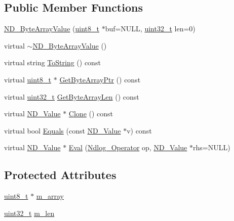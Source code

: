 \subsection*{Public Member Functions}
\begin{DoxyCompactItemize}
\item 
\hyperlink{class_n_d___byte_array_value_abc4b53c37069d57d57e9d2a9323612a3}{N\-D\-\_\-\-Byte\-Array\-Value} (\hyperlink{msus_2webserver_2uthash_8h_aba7bc1797add20fe3efdf37ced1182c5}{uint8\-\_\-t} $\ast$buf=N\-U\-L\-L, \hyperlink{msus_2webserver_2uthash_8h_a435d1572bf3f880d55459d9805097f62}{uint32\-\_\-t} len=0)
\item 
virtual \hyperlink{class_n_d___byte_array_value_acbd892eb2c5be9e60507e2c7deb8743a}{$\sim$\-N\-D\-\_\-\-Byte\-Array\-Value} ()
\item 
virtual string \hyperlink{class_n_d___byte_array_value_a38fcb45e48d627e00d135c070e3188e5}{To\-String} () const 
\item 
virtual \hyperlink{msus_2webserver_2uthash_8h_aba7bc1797add20fe3efdf37ced1182c5}{uint8\-\_\-t} $\ast$ \hyperlink{class_n_d___byte_array_value_a2af628b4a2e9b0f755466dbb2c9d9932}{Get\-Byte\-Array\-Ptr} () const 
\item 
virtual \hyperlink{msus_2webserver_2uthash_8h_a435d1572bf3f880d55459d9805097f62}{uint32\-\_\-t} \hyperlink{class_n_d___byte_array_value_a20d5108f171041a509dc6b89a4516490}{Get\-Byte\-Array\-Len} () const 
\item 
virtual \hyperlink{class_n_d___value}{N\-D\-\_\-\-Value} $\ast$ \hyperlink{class_n_d___byte_array_value_ad61295c86a009f7c94b91a906cc6b36a}{Clone} () const 
\item 
virtual bool \hyperlink{class_n_d___byte_array_value_a0989cb51cb2e0d576a2d6e6e78e561cb}{Equals} (const \hyperlink{class_n_d___value}{N\-D\-\_\-\-Value} $\ast$v) const 
\item 
virtual \hyperlink{class_n_d___value}{N\-D\-\_\-\-Value} $\ast$ \hyperlink{class_n_d___byte_array_value_af5456134d6f0cf16a2d3fb1cbcd0069d}{Eval} (\hyperlink{_n_dvalue_8h_afc938fb729c95de25b4d2eb18640b303}{Ndlog\-\_\-\-Operator} op, \hyperlink{class_n_d___value}{N\-D\-\_\-\-Value} $\ast$rhs=N\-U\-L\-L)
\end{DoxyCompactItemize}
\subsection*{Protected Attributes}
\begin{DoxyCompactItemize}
\item 
\hyperlink{msus_2webserver_2uthash_8h_aba7bc1797add20fe3efdf37ced1182c5}{uint8\-\_\-t} $\ast$ \hyperlink{class_n_d___byte_array_value_a07ab6273dff8fcc80696fb98e857a9aa}{m\-\_\-array}
\item 
\hyperlink{msus_2webserver_2uthash_8h_a435d1572bf3f880d55459d9805097f62}{uint32\-\_\-t} \hyperlink{class_n_d___byte_array_value_a2c87705e49b1b4c25841a3bf3666c103}{m\-\_\-len}
\end{DoxyCompactItemize}


